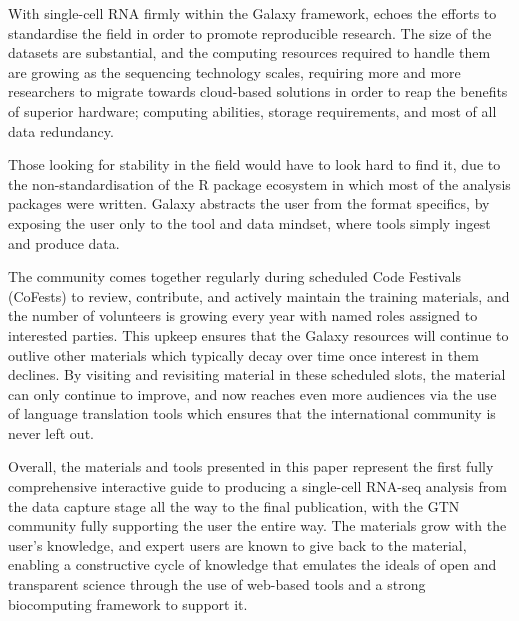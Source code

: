 \documentclass[a4paper,num-refs]{oup-contemporary}
\begin{document}
With single-cell RNA firmly within the Galaxy framework, echoes the efforts to standardise the field in order to promote reproducible research. The size of the datasets are substantial, and the computing resources required to handle them are growing as the sequencing technology scales, requiring more and more researchers to migrate towards cloud-based solutions in order to reap the benefits of superior hardware; computing abilities, storage requirements, and most of all data redundancy.

Those looking for stability in the field would have to look hard to find it, due to the non-standardisation of the R package ecosystem in which most of the analysis packages were written. Galaxy abstracts the user from the format specifics, by exposing the user only to the tool and data mindset, where tools simply ingest and produce data.

The community comes together regularly during scheduled Code Festivals (CoFests) to review, contribute, and actively maintain the training materials, and the number of volunteers is growing every year with named roles assigned to interested parties. This upkeep ensures that the Galaxy resources will continue to outlive other materials which typically decay over time once interest in them declines. By visiting and revisiting material in these scheduled slots, the material can only continue to improve, and now reaches even more audiences via the use of language translation tools which ensures that the international community is never left out.

Overall, the materials and tools presented in this paper represent the first fully comprehensive interactive guide to producing a single-cell RNA-seq analysis from the data capture stage all the way to the final publication, with the GTN community fully supporting the user the entire way. The materials grow with the user's knowledge, and expert users are known to give back to the material, enabling a constructive cycle of knowledge that emulates the ideals of open and transparent science through the use of web-based tools and a strong biocomputing framework to support it.



\end{document}
